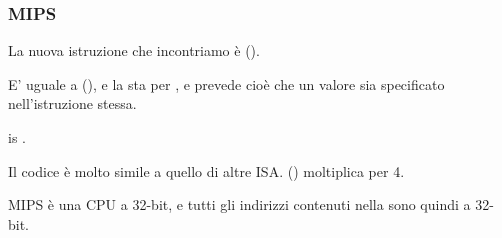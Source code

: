 \subsubsection{MIPS}




La nuova istruzione che incontriamo è  ().

E' uguale a  (), e la  sta per , 
e prevede cioè che un valore sia specificato nell'istruzione stessa.

 is .

Il codice è molto simile a quello di altre \ac{ISA}.
 () moltiplica per 4.

MIPS è una CPU a 32-bit, e tutti gli indirizzi contenuti nella  sono quindi a 32-bit.

